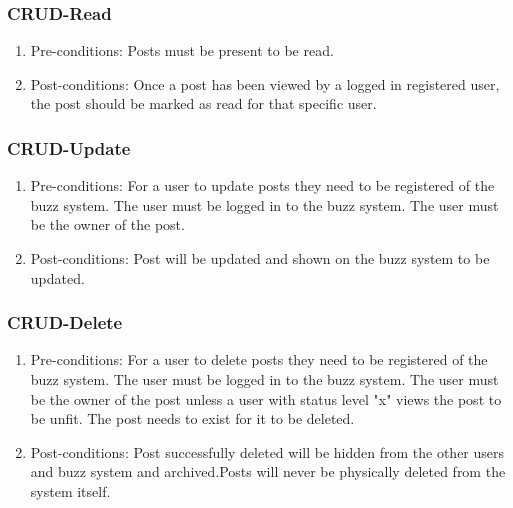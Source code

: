 \documentclass[hidelinks, 12pt, oneside]{article}
\begin{document}
\subsubsection{CRUD-Read}
\begin{enumerate}
 \item Pre-conditions: Posts must be present to be read.

 \item Post-conditions: Once a post has been viewed by a logged in registered user, the post should be marked as read for that specific user.

\end{enumerate}

\subsubsection{CRUD-Update}
\begin{enumerate}
 \item Pre-conditions:  For a user to update posts they need to be registered of the buzz system. The user must be logged in to the buzz system. The user must be the owner of the post.

 \item Post-conditions: Post will be updated and shown on the buzz system to be updated.

\end{enumerate}

\subsubsection{CRUD-Delete}
\begin{enumerate}
 \item Pre-conditions:  For a user to delete posts they need to be registered of the buzz system. The user must be logged in to the buzz system. The user must be the owner of the post unless a user with status level "x" views the post to be unfit. The post needs to exist for it to be deleted.

 \item Post-conditions: Post successfully deleted will be hidden from the other users and buzz system and archived.Posts will never be physically deleted from the system itself.

\end{enumerate}
\end{document}
